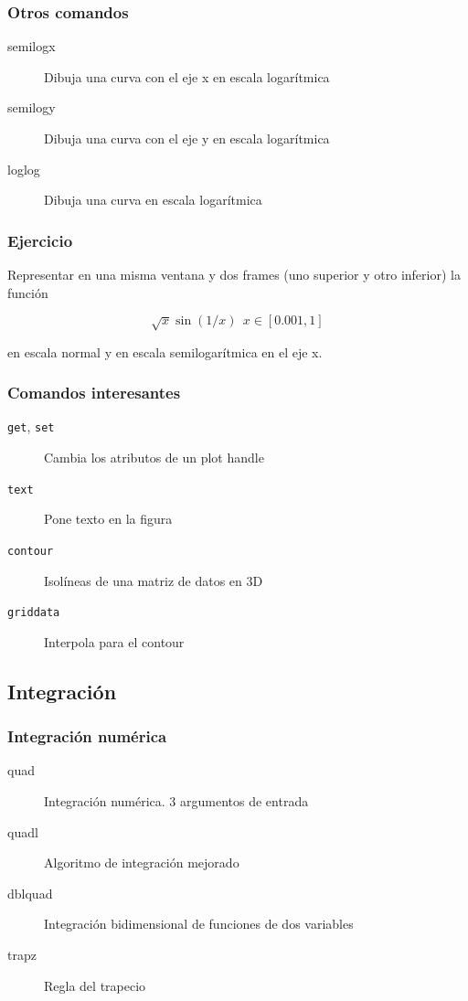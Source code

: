 \documentclass[12pt]{beamer}
\begin{document}
\begin{frame}
\frametitle{Otros comandos}
\begin{description}
\item[semilogx] Dibuja una curva con el eje x en escala logarítmica
\item[semilogy] Dibuja una curva con el eje y en escala logarítmica
\item[loglog] Dibuja una curva en escala logarítmica
\end{description}
\end{frame}

\begin{frame}
\frametitle{Ejercicio}

Representar en una misma ventana y dos frames (uno superior y otro
inferior) la función

\[ \sqrt{x} \sin(1/x)\ \ x \in[0.001,1]  \]

en escala normal y en escala semilogarítmica en el eje x.
\end{frame}

\begin{frame}
\frametitle{Comandos interesantes}
\begin{description}
\item[\texttt{get}, \texttt{set}] Cambia los atributos de un plot
  handle
\item[\texttt{text}] Pone texto en la figura
\item[\texttt{contour}] Isolíneas de una matriz de datos en 3D
\item[\texttt{griddata}] Interpola para el contour
\end{description}
\end{frame}

\subsection{Integración}

\begin{frame}
\frametitle{Integración numérica}
\begin{description}
\item[quad] Integración numérica. 3 argumentos de entrada
\item[quadl] Algoritmo de integración mejorado
\item[dblquad] Integración bidimensional de funciones de dos variables
\item[trapz] Regla del trapecio
\end{description}
\end{frame}
\end{document}
